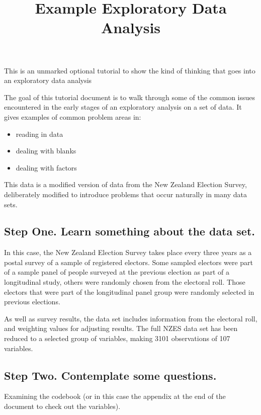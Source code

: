 \documentclass[]{article}
\title{Example Exploratory Data Analysis}
\author{}
\date{}
\providecommand{\tightlist}{%
  \setlength{\itemsep}{0pt}\setlength{\parskip}{0pt}}
\begin{document}
\maketitle

\hypertarget{instructions}{}
This is an unmarked optional tutorial to show the kind of thinking that
goes into an exploratory data analysis

The goal of this tutorial document is to walk through some of the common
issues encountered in the early stages of an exploratory analysis on a
set of data. It gives examples of common problem areas in:

\begin{itemize}
\tightlist
\item
  reading in data
\item
  dealing with blanks
\item
  dealing with factors
\end{itemize}

This data is a modified version of data from the New Zealand Election
Survey, deliberately modified to introduce problems that occur naturally
in many data sets.

\subsection{Step One. Learn something about the data
set.}\label{step-one.-learn-something-about-the-data-set.}

In this case, the New Zealand Election Survey takes place every three
years as a postal survey of a sample of registered electors. Some
sampled electors were part of a sample panel of people surveyed at the
previous election as part of a longitudinal study, others were randomly
chosen from the electoral roll. Those electors that were part of the
longitudinal panel group were randomly selected in previous elections.

As well as survey results, the data set includes information from the
electoral roll, and weighting values for adjusting results. The full
NZES data set has been reduced to a selected group of variables, making
3101 observations of 107 variables.

\subsection{Step Two. Contemplate some
questions.}\label{step-two.-contemplate-some-questions.}

Examining the codebook (or in this case the appendix at the end of the
document to check out the variables).
\end{document}
